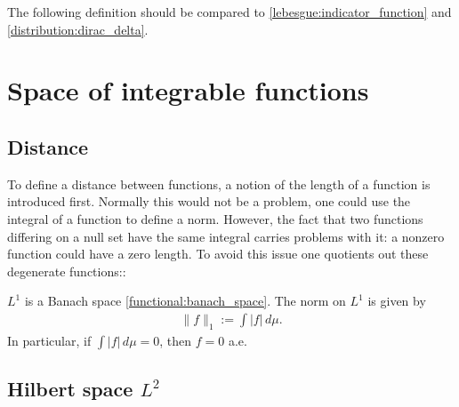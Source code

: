     The following definition should be compared to \ref{lebesgue:indicator_function} and \ref{distribution:dirac_delta}.

\section{Space of integrable functions}
\subsection{Distance}

    To define a distance between functions, a notion of the length of a function is introduced first. Normally this would not be a problem, one could use the integral of a function to define a norm. However, the fact that two functions differing on a null set have the same integral carries problems with it: a nonzero function could have a zero length. To avoid this issue one quotients out these degenerate functions::
    \begin{property}
        $L^1$ is a Banach space \ref{functional:banach_space}. The norm on $L^1$ is given by
        \begin{gather}
            \label{lebesgue:L1_norm}
            \|f\|_1 := \int|f|\,d\mu.
        \end{gather}
        In particular, if $\int|f|\,d\mu=0$, then $f=0$ a.e.
    \end{property}

\subsection{Hilbert space \texorpdfstring{$L^2$}{L2}}\label{section:hilbert_space}

